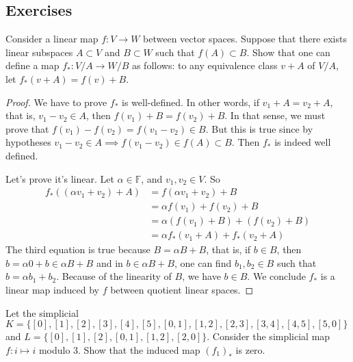 \subsection{Exercises}

\begin{exercise}
    Consider a linear map $f : V \to W$ between vector spaces. Suppose that
    there exists linear subspaces $A \subset V$ and $B \subset W$ such that
    $f(A) \subset B$. Show that one can define a map $f_* : V /A \to W/B $ as
    follows: to any equivalence class $v + A$ of $V /A$, let $f_*(v + A) = f(v) + B$.
\end{exercise}

\begin{proof}
    We have to prove $f_*$ is well-defined. In other words, if $v_1 + A = v_2 + A$, that
    is, $v_1 - v_2 \in A$, then $f(v_1) + B = f(v_2) + B$. In that sense, we must
    prove that $f(v_1) - f(v_2) = f(v_1 - v_2) \in B$. But this is true since by
    hypotheses $v_1 - v_2 \in A \implies f(v_1 - v_2) \in f(A) \subset B$. Then
    $f_*$ is indeed well defined. 

    Let's prove it's linear. Let $\alpha \in \mathbb{F}$, and $v_1, v_2 \in V$. So
    \begin{equation*}
        \begin{split}
            f_*((\alpha v_1 + v_2) + A) &= f(\alpha v_1 + v_2) + B \\
            &= \alpha f(v_1) + f(v_2) + B \\
            &= \alpha(f(v_1) + B) + (f(v_2) + B) \\
            &= \alpha f_*(v_1 + A) + f_*(v_2 + A)
        \end{split}
    \end{equation*}
    The third equation is true because $B = \alpha B + B$, that is, if $b \in B$,
    then $b = \alpha 0 + b \in \alpha B + B$ and in $b \in \alpha B + B$, one can
    find $b_1, b_2 \in B$ such that $b = \alpha b_1 + b_2$. Because of the
    linearity of $B$, we have $b \in B$.  We conclude $f_*$ is a linear map
    induced by $f$ between quotient linear spaces.     
\end{proof}

\noindent\linia

\begin{exercise}
    Let the simplicial $K = \{[0], [1], [2], [3], [4], [5], [0, 1], [1, 2], [2, 3], [3, 4],
    [4, 5], [5, 0]\}$ and  $L = \{[0], [1], [2], [0, 1], [1, 2], [2, 0]\}$.
    Consider the simplicial map $f : i \mapsto i$ modulo 3. Show that the induced map $(f_1)_*$ is zero.
\end{exercise}

